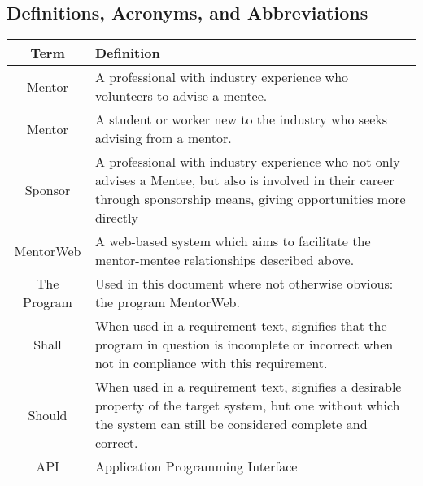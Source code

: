 \documentclass[11pt]{article}
\begin{document}
    \subsection{Definitions, Acronyms, and Abbreviations}
        \begin{tabular}{cp{10 cm}}
            Term                 & Definition \\ \hline
            Mentor\index{Mentor} & A professional with industry experience who
                                   volunteers to advise a mentee. \\ \hline
            Mentor\index{Mentee} & A student or worker new to the industry who
                                   seeks advising from a mentor. \\ \hline
            Sponsor\index{Sponsor}
                                 & A professional with industry experience who
                                   not only advises a Mentee, but also is
                                   involved in their career through sponsorship
                                   means, giving opportunities more directly
                                   \\ \hline
            MentorWeb\index{MentorWeb}
                                 & A web-based system which aims to facilitate
                                   the mentor\index{Mentor}-mentee\index{Mentee}
                                   relationships described above. \\ \hline
            The Program          & Used in this document where not otherwise
                                   obvious: the program MentorWeb. \\ \hline
            Shall                & When used in a requirement text, signifies
                                   that the program in question is incomplete or
                                   incorrect when not in compliance with this
                                   requirement. \\ \hline
            Should               & When used in a requirement text, signifies
                                   a desirable property of the target system,
                                   but one without which the system can still be
                                   considered complete and correct. \\ \hline
            API                  & Application Programming Interface \\ \hline
        \end{tabular}
\end{document}
